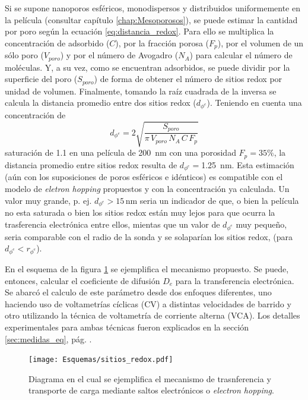 	 	 Si se supone nanoporos esféricos, monodispersos y distribuidos uniformemente en la película (consultar capítulo \ref{chap:Mesoporosos}), se puede estimar la cantidad \ru\space por poro según la ecuación \ref{eq:distancia_redox}. Para ello se multiplica la concentración de \ru\space adsorbido ($C$), por la fracción porosa ($F_p$), por el volumen de un sólo poro ($V_{poro}$) y por el número de Avogadro ($N_{A}$) para calcular el número de moléculas. Y, a su vez, como se encuentran adsorbidos, se puede dividir por la superficie del poro ($S_{poro}$) de forma de obtener el número de sitios redox por unidad de volumen. Finalmente, tomando la raíz cuadrada de la inversa se calcula la distancia promedio entre dos sitios redox ($d_{\phi^{e}}$). Teniendo en cuenta una concentración de \linebreak
	 		\begin{equation}
					d_{\phi^{e}}=2\sqrt{\frac{S_{poro}}{\pi\, V_{poro}\, N_A\, C\, F_p}}
					\label{eq:distancia_redox}
			\end{equation}
	     saturación de \SI{1,1}{\Molar} en una película de \SI{200}{nm} con una porosidad $F_p=35\%$, la distancia promedio entre sitios redox resulta de $d_{\phi^{e}}=$\SI{1.25}{nm}. Esta estimación (aún con los suposiciones de poros esféricos e idénticos) es compatible con el modelo de \textit{eletron hopping} propuestos y con la concentración ya calculada. Un valor muy grande, p. ej. $d_{\phi^{e}}>15\, \text{nm}$ seria un indicador de que, o bien la película no esta saturada o bien los sitios redox están muy lejos para que ocurra la trasferencia electrónica entre ellos, mientas que un valor de $d_{\phi^{e}}$ muy pequeño, seria comparable con el radio de la sonda y se solaparían los sitios redox, (para $d_{\phi^{e}} < r_{\phi^{e}}$). 
	
	    	 En el esquema de la figura \ref{fig:sitios_redox} se ejemplifica el mecanismo propuesto. Se puede, entonces, calcular el coeficiente de difusión $D_e$ para la transferencia electrónica. Se abarcó el calculo de este parámetro desde dos enfoques diferentes, uno haciendo uso de voltametrías cíclicas (CV) a distintas velocidades de barrido y otro utilizando la técnica de voltametría de corriente alterna (VCA). Los detalles experimentales para ambas técnicas fueron explicados en la sección \ref{sec:medidas_eq}, pág. \pageref{sec:medidas_eq}.
			\begin{figure}[ht!]
					\centering
			 	    \texttt{[image: Esquemas/sitios\_redox.pdf]}
			        \caption[Mecanismo de transferencia de electrones]{Diagrama en el cual se ejemplifica el mecanismo de trasnferencia y transporte de carga mediante saltos electrónicos o \textit{electron hopping}.}
			        \label{fig:sitios_redox}
			      	\end{figure} 

